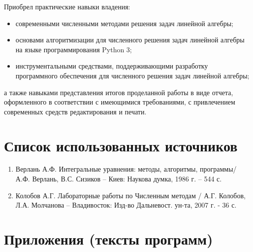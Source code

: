 \documentclass[14pt, a4paper]{extarticle}
\begin{document}
	Приобрел практические навыки владения:
	
	\begin{itemize}
	\item современными численными методами решения задач линейной алгебры;
	
	\item основами алгоритмизации для численного решения задач линейной алгебры на языке программирования Python 3;
	
	\item инструментальными средствами, поддерживающими разработку программного обеспечения для численного решения задач линейной алгебры;
	
	\end{itemize}
	а также навыками представления итогов проделанной работы в виде отчета, оформленного в соответствии с имеющимися требованиями, с привлечением современных средств редактирования и печати.
	\section{Список использованных источников}
	\begin{enumerate}
		\item Верлань А.Ф. Интегральные уравнения: методы, алгоритмы, программы/ А.Ф. Верлань, В.С. Сизиков -- Киев: Наукова думка, 1986 г. – 544 с.
		
		\item Колобов А.Г. Лабораторные работы по Численным методам / А.Г. Колобов, Л.А. Молчанова -- Владивосток: Изд-во Дальневост. ун-та, 2007 г. - 36 с.
	\end{enumerate}
	
	\section{Приложения (тексты программ)}
				
\end{document}
